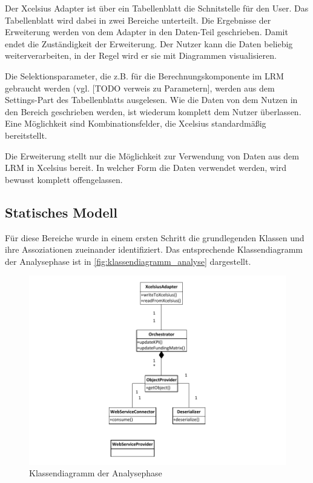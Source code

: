 Der Xcelsius Adapter ist über ein Tabellenblatt die Schnitstelle für den User. Das Tabellenblatt wird dabei in zwei Bereiche unterteilt. Die Ergebnisse der Erweiterung werden von dem Adapter in den Daten-Teil geschrieben. Damit endet die Zuständigkeit der Erweiterung. Der Nutzer kann die Daten beliebig weiterverarbeiten, in der Regel wird er sie mit Diagrammen visualisieren.

Die Selektionsparameter, die z.B. für die Berechnungskomponente im LRM gebraucht werden (vgl. [TODO verweis zu Parametern], werden aus dem Settings-Part des Tabellenblatts ausgelesen. Wie die Daten von dem Nutzen in den Bereich geschrieben werden, ist wiederum komplett dem Nutzer überlassen. Eine Möglichkeit sind Kombinationsfelder, die Xcelsius standardmäßig bereitstellt.

Die Erweiterung stellt nur die Möglichkeit zur Verwendung von Daten aus dem LRM in Xcelsius bereit. In welcher Form die Daten verwendet werden, wird bewusst komplett offengelassen.

\subsection{Statisches Modell}
Für diese Bereiche wurde in einem ersten Schritt die grundlegenden Klassen und ihre Assoziationen zueinander identifiziert. Das entsprechende Klassendiagramm der Analysephase ist in \vref{fig:klassendiagramm_analyse} dargestellt.

\begin{figure}[h]
\centering
\setlength{\unitlength}{1mm}
\includegraphics[width=15cm]{Visio/Analyse.pdf}
\caption{Klassendiagramm der Analysephase\label{fig:klassendiagramm_analyse}}
\end{figure}

